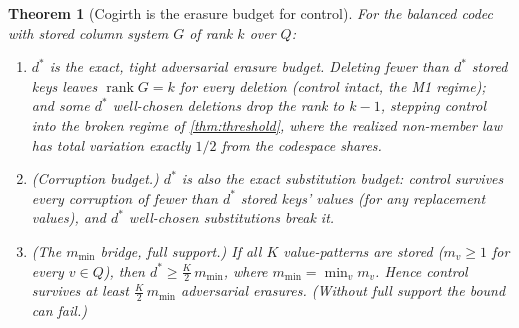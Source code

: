 \documentclass[11pt]{article}
\theoremstyle{definition}
\theoremstyle{plain}
\newtheorem{theorem}{Theorem}[section]
\theoremstyle{remark}
\DeclareMathOperator{\rank}{rank}
\newcommand{\Quot}{Q}                       %
\begin{document}
\begin{theorem}[Cogirth is the erasure budget for control]
\label{thm:cogirth}
For the balanced codec with stored column system $G$ of rank $k$ over $\Quot$:
\begin{enumerate}
  \item $d^\ast$ is the \emph{exact, tight} adversarial erasure budget. Deleting fewer
  than $d^\ast$ stored keys leaves $\rank G = k$ for \emph{every} deletion (control intact,
  the M1 regime); and some $d^\ast$ well-chosen deletions drop the rank to $k-1$, stepping
  control into the broken regime of \cref{thm:threshold}, where the realized non-member law
  has total variation exactly $1/2$ from the codespace shares.
  \item \emph{(Corruption budget.)} $d^\ast$ is also the exact \emph{substitution} budget:
  control survives every corruption of fewer than $d^\ast$ stored keys' values (for any
  replacement values), and $d^\ast$ well-chosen substitutions break it.
  \item \emph{(The $m_{\min}$ bridge, full support.)} If all $K$ value-patterns are stored
  ($m_v \ge 1$ for every $v \in \Quot$), then $d^\ast \ge \tfrac{K}{2}\, m_{\min}$, where
  $m_{\min} = \min_v m_v$. Hence control survives at least $\tfrac{K}{2}\,m_{\min}$
  adversarial erasures. (Without full support the bound can fail.)
\end{enumerate}
\end{theorem}
\end{document}
